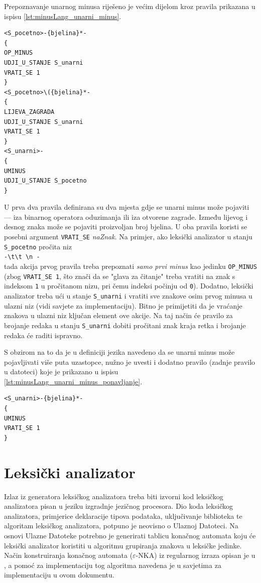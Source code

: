 \documentclass[times, 12pt, utf8]{book}
\begin{document}
Prepoznavanje unarnog minusa riješeno je većim dijelom kroz pravila prikazana u ispisu \ref{lst:minusLang_unarni_minus}.

\begin{lstlisting}[caption={Pravila za detekciju unarnog minusa.},label=lst:minusLang_unarni_minus]
<S_pocetno>-{bjelina}*-
{
OP_MINUS
UDJI_U_STANJE S_unarni
VRATI_SE 1
}
<S_pocetno>\({bjelina}*-
{
LIJEVA_ZAGRADA
UDJI_U_STANJE S_unarni
VRATI_SE 1
}
<S_unarni>-
{
UMINUS
UDJI_U_STANJE S_pocetno
}
\end{lstlisting}

U prva dva pravila definirana su dva mjesta gdje se unarni minus može pojaviti --- iza binarnog operatora oduzimanja ili iza otvorene zagrade.
Između lijevog i desnog znaka može se pojaviti proizvoljan broj bjelina.
U oba pravila koristi se posebni argument \verb|VRATI_SE| \emph{naZnak}.
Na primjer, ako leksički analizator u stanju \verb|S_pocetno| pročita niz\\
\verb|-\t\t \n -|\\
tada akcija prvog pravila treba prepoznati \emph{samo prvi minus} kao jedinku \verb|OP_MINUS| (zbog \verb|VRATI_SE 1|, što znači da se "glava za čitanje" treba vratiti na znak s indeksom \verb|1| u pročitanom nizu, pri čemu indeksi počinju od \verb|0|).
Dodatno, leksički analizator treba ući u stanje \verb|S_unarni| i vratiti sve znakove osim prvog minusa u ulazni niz (vidi savjete za implementaciju).
Bitno je primijetiti da je vraćanje znakova u ulazni niz ključan element ove akcije.
Na taj način će pravilo za brojanje redaka u stanju \verb|S_unarni| dobiti pročitani znak kraja retka i brojanje redaka će raditi ispravno.

S obzirom na to da je u definiciji jezika navedeno da se unarni minus može pojavljivati više puta uzastopce, nužno je uvesti i dodatno pravilo (zadnje pravilo u datoteci) koje je prikazano u ispisu \ref{lst:minusLang_unarni_minus_ponavljanje}.

\begin{lstlisting}[caption={Pravila za detekciju ponavljanja unarnog minusa.},label=lst:minusLang_unarni_minus_ponavljanje]
<S_unarni>-{bjelina}*-
{
UMINUS
VRATI_SE 1
}
\end{lstlisting}

\section{Leksički analizator}\label{sec:leksicki_analizator}
Izlaz iz generatora leksičkog analizatora treba biti izvorni kod leksičkog analizatora pisan u jeziku izgradnje jezičnog procesora.
Dio koda leksičkog analizatora, primjerice deklaracije tipova podataka, uključivanje biblioteka te algoritam leksičkog analizatora, potpuno je neovisno o Ulaznoj Datoteci.
Na osnovi Ulazne Datoteke potrebno je generirati tablicu konačnog automata koju će leksički analizator koristiti u algoritmu grupiranja znakova u leksičke jedinke.
Način konstruiranja konačnog automata (\(\varepsilon\)-NKA) iz regularnog izraza opisan je u \cite[poglavlje 2.2.2]{utr}, a pomoć za implementaciju tog algoritma navedena je u savjetima za implementaciju u ovom dokumentu.
\end{document}
